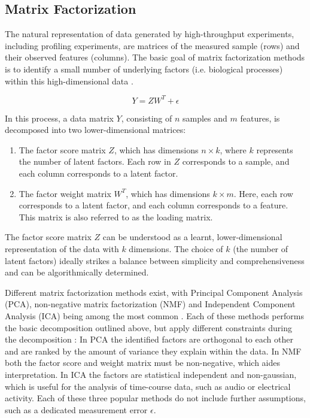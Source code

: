 \begin{flushleft}
\subsection{Matrix Factorization}
The natural representation of data generated by high-throughput experiments, including profiling experiments, are matrices of the measured sample (rows) and their observed features (columns). The basic goal of matrix factorization methods is to identify a small number of underlying factors (i.e. biological processes) within this high-dimensional data \citep{stein-obrienEnterMatrixFactorization2018}. 

\begin{equation}
    Y = ZW^T + \epsilon
\end{equation}

In this process, a data matrix \( Y \), consisting of \( n \) samples and \( m \) features, is decomposed into two lower-dimensional matrices: 

\begin{enumerate}
    \item The factor score matrix \( Z \), which has dimensions \( n \times k \), where \( k \) represents the number of latent factors. Each row in \( Z \) corresponds to a sample, and each column corresponds to a latent factor.
    \item The factor weight matrix \( W^T \), which has dimensions \( k \times m \). Here, each row corresponds to a latent factor, and each column corresponds to a feature. This matrix is also referred to as the loading matrix. 
\end{enumerate}

The factor score matrix \( Z \) can be understood as a learnt, lower-dimensional representation of the data with \( k \) dimensions. The choice of \( k \) (the number of latent factors) ideally strikes a balance between simplicity and comprehensiveness and can be algorithmically determined. 

Different matrix factorization methods exist, with Principal Component Analysis (PCA), non-negative matrix factorization (NMF) and Independent Component Analysis (ICA) being among the most common \citep{stein-obrienEnterMatrixFactorization2018}. Each of these methods performs the basic decomposition outlined above, but apply different constraints during the decomposition \citep{stein-obrienEnterMatrixFactorization2018}: In PCA the identified factors are orthogonal to each other and are ranked by the amount of variance they explain within the data. In NMF both the factor score and weight matrix must be non-negative, which aides interpretation. In ICA the factors are statistical independent and non-gaussian, which is useful for the analysis of time-course data, such as audio or electrical activity. Each of these three popular methods do not include further assumptions, such as a dedicated measurement error \(\epsilon\).


\end{flushleft}
